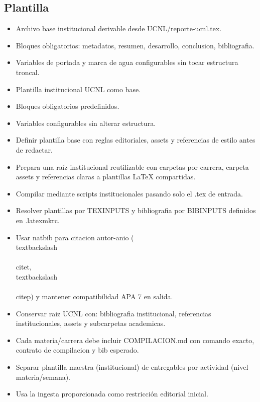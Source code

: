 \documentclass[12pt]{article}
\begin{document}
\subsection*{Plantilla}
\begin{itemize}[leftmargin=*]
  \item Archivo base institucional derivable desde UCNL/reporte-ucnl.tex.
  \item Bloques obligatorios: metadatos, resumen, desarrollo, conclusion, bibliografia.
  \item Variables de portada y marca de agua configurables sin tocar estructura troncal.
  \item Plantilla institucional UCNL como base.
  \item Bloques obligatorios predefinidos.
  \item Variables configurables sin alterar estructura.
  \item Definir plantilla base con reglas editoriales, assets y referencias de estilo antes de redactar.
  \item Prepara una raíz institucional reutilizable con carpetas por carrera, carpeta assets y referencias claras a plantillas LaTeX compartidas.
  \item Compilar mediante scripts institucionales pasando solo el .tex de entrada.
  \item Resolver plantillas por TEXINPUTS y bibliografia por BIBINPUTS definidos en .latexmkrc.
  \item Usar natbib para citacion autor-anio (\\textbackslash\\{\\}citet, \\textbackslash\\{\\}citep) y mantener compatibilidad APA 7 en salida.
  \item Conservar raiz UCNL con: bibliografia institucional, referencias institucionales, assets y subcarpetas academicas.
  \item Cada materia/carrera debe incluir COMPILACION.md con comando exacto, contrato de compilacion y bib esperado.
  \item Separar plantilla maestra (institucional) de entregables por actividad (nivel materia/semana).
  \item Usa la ingesta proporcionada como restricción editorial inicial.
\end{itemize}
\end{document}
